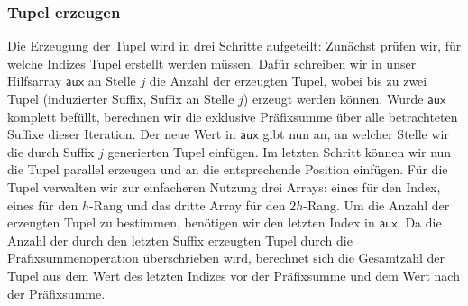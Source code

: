 \subsubsection{Tupel erzeugen}
Die Erzeugung der Tupel wird in drei Schritte aufgeteilt: Zunächst prüfen wir, für welche Indizes Tupel erstellt werden müssen. Dafür schreiben wir in unser Hilfsarray $\mathsf{aux}$ an Stelle $j$ die Anzahl der erzeugten Tupel, wobei bis zu zwei Tupel (induzierter Suffix, Suffix an Stelle $j$) erzeugt werden können. Wurde $\mathsf{aux}$ komplett befüllt, berechnen wir die exklusive Präfixsumme über alle betrachteten Suffixe dieser Iteration. Der neue Wert in $\mathsf{aux}$ gibt nun an, an welcher Stelle wir die durch Suffix $j$ generierten Tupel einfügen. Im letzten Schritt können wir nun die Tupel parallel erzeugen und an die entsprechende Position einfügen. 
Für die Tupel verwalten wir zur einfacheren Nutzung drei Arrays: eines für den Index, eines für den $h$-Rang und das dritte Array für den $2h$-Rang. Um die Anzahl der erzeugten Tupel zu bestimmen, benötigen wir den letzten Index in $\mathsf{aux}$. Da die Anzahl der durch den letzten Suffix erzeugten Tupel durch die Präfixsummenoperation überschrieben wird, berechnet sich die Gesamtzahl der Tupel aus dem Wert des letzten Indizes vor der Präfixsumme und dem Wert nach der Präfixsumme.

